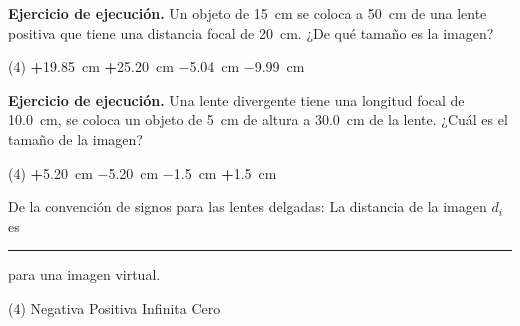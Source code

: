 \documentclass[12pt]{exam}
\begin{document}
\begin{questions}

    \question \label{Ejercicio_07} \textbf{Ejercicio de ejecución.} Un objeto de \SI{15}{\centi\meter} se coloca a \SI{50}{\centi\meter} de una lente positiva que tiene una distancia focal de \SI{20}{\centi\meter}. ¿De qué tamaño es la imagen?

    \vspace{0.3cm}
    \begin{tasks}(4)
        \task \textbf{+}\SI{19.85}{\centi\meter}
        \task \textbf{+}\SI{25.20}{\centi\meter}
        \task \SI{-5.04}{\centi\meter}
        \task \SI{-9.99}{\centi\meter}
    \end{tasks}
    \question \label{Ejercicio_08} \textbf{Ejercicio de ejecución.} Una lente divergente tiene una longitud focal de \SI{10.0}{\centi\meter}, se coloca un objeto de \SI{5}{\centi\meter} de altura a \SI{30.0}{\centi\meter} de la lente. ¿Cuál es el tamaño de la imagen?
    \begin{tasks}(4)
        \task \textbf{+}\SI{5.20}{\centi\meter}
        \task \SI{-5.20}{\centi\meter}
        \task \SI{-1.5}{\centi\meter}
        \task \textbf{+}\SI{1.5}{\centi\meter}
    \end{tasks}
    \question De la convención de signos para las lentes delgadas: La distancia de la imagen $d_{i}$ es \rule{2cm}{0.1mm} para una imagen virtual.
    \begin{tasks}(4)
        \task Negativa
        \task Positiva
        \task Infinita
        \task Cero
    \end{tasks}


\end{questions}
\end{document}
